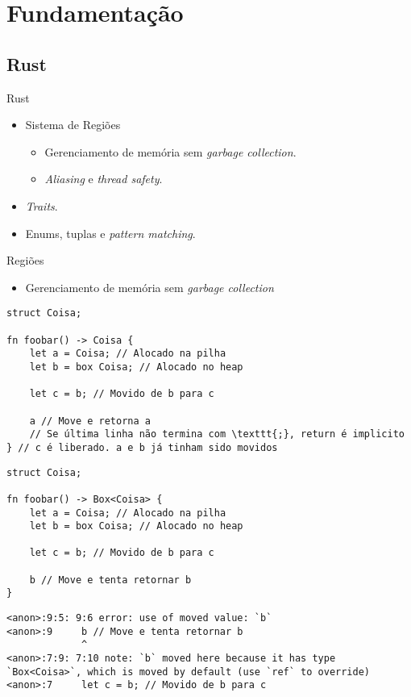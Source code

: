 \documentclass{beamer}
\begin{document}
\section{Fundamentação}
\subsection{Rust}
\begin{frame}{Rust}
	\begin{itemize}
		\item Sistema de Regiões
		\begin{itemize}
			\item Gerenciamento de memória sem \emph{garbage collection}.
			\item \emph{Aliasing} e \emph{thread safety}.
		\end{itemize}
		\item \emph{Traits}.
		\item Enums, tuplas e \emph{pattern matching}.
	\end{itemize}
\end{frame}

\begin{frame}[fragile]{Regiões}
	\begin{itemize}
		\item Gerenciamento de memória sem \emph{garbage collection}
	\end{itemize}
	\begin{overprint}
	\begin{lstlisting}
struct Coisa;

fn foobar() -> Coisa {
    let a = Coisa; // Alocado na pilha
    let b = box Coisa; // Alocado no heap
    
    let c = b; // Movido de b para c
    
    a // Move e retorna a
    // Se última linha não termina com \texttt{;}, return é implicito
} // c é liberado. a e b já tinham sido movidos
	\end{lstlisting}

	\begin{lstlisting}
struct Coisa;

fn foobar() -> Box<Coisa> {
    let a = Coisa; // Alocado na pilha
    let b = box Coisa; // Alocado no heap
    
    let c = b; // Movido de b para c
    
    b // Move e tenta retornar b
}
	\end{lstlisting}

	\begin{lstlisting}[numbers=none, breaklines=true]
<anon>:9:5: 9:6 error: use of moved value: `b`
<anon>:9     b // Move e tenta retornar b
             ^
<anon>:7:9: 7:10 note: `b` moved here because it has type `Box<Coisa>`, which is moved by default (use `ref` to override)
<anon>:7     let c = b; // Movido de b para c
	\end{lstlisting}
	\end{overprint}
\end{frame}
\end{document}
